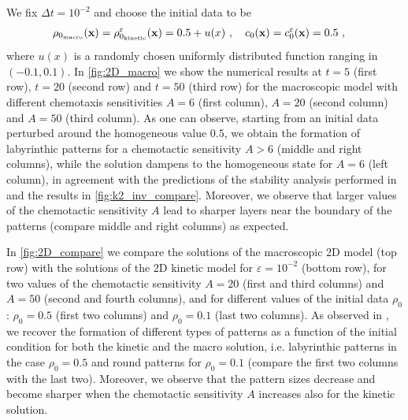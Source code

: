 \documentclass[review,onefignum,onetabnum]{siamart220329}
\begin{document}
We fix $\Delta t = 10^{-2}$ and choose the initial data to be
\begin{align*}
	&\rho_{0_\textnormal{macro}}(\mathbf{x}) =  \rho_{0_\textnormal{kinetic}}^\varepsilon(\mathbf{x}) =  0.5+u(x)\ , \quad c_0(\mathbf{x}) = c_0^\varepsilon(\mathbf{x}) = 0.5\ , %
\end{align*}
where $u(x)$ is a randomly chosen uniformly distributed function ranging in $(-0.1, 0.1)$. 
In \cref{fig:2D_macro} we show the numerical results at $t=5$ (first row), $t=20$ (second row) and $t=50$ (third row) for the macroscopic model with different chemotaxis sensitivities $A=6$ (first column), $A=20$ (second column) and $A=50$ (third column). As one can observe, starting from an initial data perturbed around the homogeneous value $0.5$, we obtain the formation of labyrinthic patterns for a chemotactic sensitivity $A>6$ (middle and right columns), while the solution dampens to the homogeneous state for $A=6$ (left column), in agreement with the predictions of the stability analysis performed in \cite{almeida2020treatment} and the results in \cref{fig:k2_inv_compare}. Moreover, we observe that larger values of the chemotactic sensitivity $A$ {\color{red}lead} to sharper layers near the boundary of the patterns (compare middle and right columns) as expected. 

In \cref{fig:2D_compare} we compare the solutions of the macroscopic 2D model (top row) with the solutions of the 2D kinetic model for $\varepsilon = 10^{-2}$ (bottom row), for two values of the chemotactic sensitivity $A = 20$ (first and third columns) and $A = 50$ (second and fourth columns), and for different values of the initial data $\rho_0$: $\rho_0 = 0.5$ (first two columns) and $\rho_0 = 0.1$ (last two columns). As observed in \cite{painter2002volume}, we recover the formation of different types of patterns as a function of the initial condition for both the kinetic and the macro solution, i.e. labyrinthic patterns in the case $\rho_0 = 0.5$ and round patterns for $\rho_0 = 0.1$ (compare the first two columns with the last two). Moreover, we observe that the pattern sizes decrease and become sharper when the chemotactic sensitivity $A$ increases also for the kinetic solution.%
\end{document}
